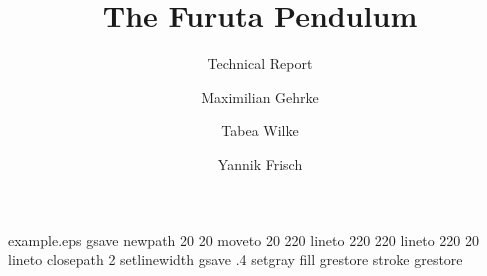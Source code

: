 %
%
%
%
%
\begin{filecontents*}{example.eps}
gsave
newpath
  20 20 moveto
  20 220 lineto
  220 220 lineto
  220 20 lineto
closepath
2 setlinewidth
gsave
  .4 setgray fill
grestore
stroke
grestore
\end{filecontents*}
%
\RequirePackage{fix-cm}
%
\documentclass[smallextended]{svjour3}       %
%
\smartqed  %
%
\usepackage{graphicx}
\usepackage[numbers]{natbib}%
\usepackage{amsmath}
%
%
%
%
%


\title{The Furuta Pendulum
}
\subtitle{Technical Report}


\author{Maximilian Gehrke \and Tabea Wilke \and Yannik Frisch %
}



